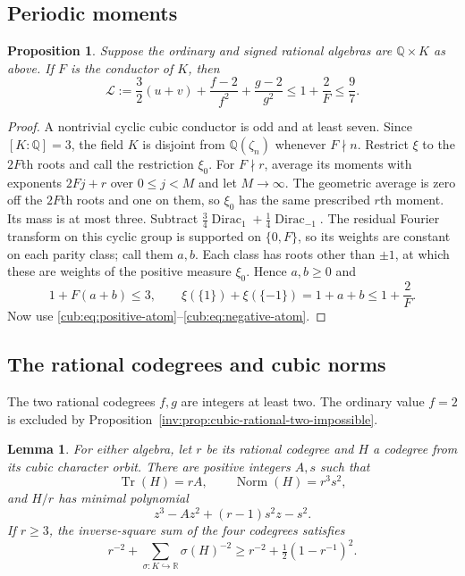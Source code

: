 \documentclass[11pt,a4paper]{article}
\newtheorem{proposition}[theorem]{Proposition}
\newtheorem{lemma}[theorem]{Lemma}
\theoremstyle{definition}\newtheorem{definition}[theorem]{Definition}
\theoremstyle{remark}\newtheorem{remark}[theorem]{Remark}
\newcommand{\Q}{\mathbb Q}
\newcommand{\R}{\mathbb R}
\numberwithin{equation}{section}
\begin{document}
\subsection{Periodic moments}
\begin{proposition}\label{cub:prop:cubic-periodic}
Suppose the ordinary and signed rational algebras are $\Q\times K$
as above. If $F$ is the conductor of $K$, then
\begin{equation}\label{cub:eq:cubic-periodic}
 \mathcal L:=\frac32(u+v)+\frac{f-2}{f^2}+\frac{g-2}{g^2}
          \le1+\frac2F\le\frac97.
\end{equation}
\end{proposition}
\begin{proof}
A nontrivial cyclic cubic conductor is odd and at least seven.
Since $[K:\Q]=3$, the field $K$ is disjoint from
$\Q(\zeta_n)$ whenever $F\nmid n$.
Restrict $\xi$ to the $2F$th roots and call the restriction $\xi_0$.
For $F\nmid r$, average its moments with exponents $2Fj+r$ over
$0\le j<M$ and let $M\to\infty$. The geometric average is zero off
the $2F$th roots and one on them, so $\xi_0$ has the same prescribed
$r$th moment. Its mass is at most three.
Subtract $\tfrac34\operatorname{Dirac}_1+
\tfrac14\operatorname{Dirac}_{-1}$. The residual Fourier transform
on this cyclic group is supported on $\{0,F\}$, so its weights are
constant on each parity class; call them $a,b$.
Each class has roots other than $\pm1$, at which these are weights
of the positive measure $\xi_0$. Hence $a,b\ge0$ and
\[
 1+F(a+b)\le3,\qquad
 \xi(\{1\})+\xi(\{-1\})=1+a+b\le1+\frac2F.
\]
Now use \eqref{cub:eq:positive-atom}--\eqref{cub:eq:negative-atom}.
\end{proof}

\subsection{The rational codegrees and cubic norms}
The two rational codegrees $f,g$ are integers at least two. The
ordinary value $f=2$ is excluded by
Proposition~\ref{inv:prop:cubic-rational-two-impossible}.

\begin{lemma}\label{cub:lem:cubic-square-norm-schur}
For either algebra, let $r$ be its rational codegree and $H$ a codegree
from its cubic character orbit. There are positive integers $A,s$ such
that
\[
 \operatorname{Tr}(H)=rA,\qquad
 \operatorname{Norm}(H)=r^3s^2,
\]
and $H/r$ has minimal polynomial
\begin{equation}\label{cub:eq:cubic-normalized-polynomial}
 z^3-Az^2+(r-1)s^2z-s^2.
\end{equation}
If $r\ge3$, the inverse-square sum of the four codegrees satisfies
\begin{equation}\label{cub:eq:cubic-uniform-schur}
 r^{-2}+\sum_{\sigma:K\hookrightarrow\R}\sigma(H)^{-2}
 \ge r^{-2}+\tfrac12(1-r^{-1})^2.
\end{equation}
\end{lemma}
\end{document}

